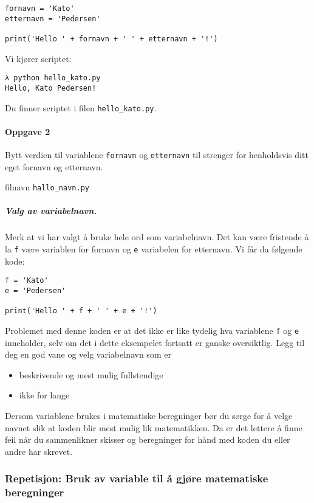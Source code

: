 \documentclass[]{article}
\providecommand{\tightlist}{%
  \setlength{\itemsep}{0pt}\setlength{\parskip}{0pt}}
\let\oldparagraph\paragraph
\renewcommand{\paragraph}[1]{\oldparagraph{#1}\mbox{}}
\let\oldsubparagraph\subparagraph
\renewcommand{\subparagraph}[1]{\oldsubparagraph{#1}\mbox{}}
\begin{document}
\begin{verbatim}
fornavn = 'Kato'
etternavn = 'Pedersen'

print('Hello ' + fornavn + ' ' + etternavn + '!')
\end{verbatim}

Vi kjører scriptet:

\begin{verbatim}
λ python hello_kato.py
Hello, Kato Pedersen!
\end{verbatim}

Du finner scriptet i filen \texttt{hello\_kato.py}.

\paragraph{Oppgave 2}\label{oppgave-2}

Bytt verdien til variablene \texttt{fornavn} og \texttt{etternavn} til
strenger for henholdsvis ditt eget fornavn og etternavn.

filnavn \texttt{hallo\_navn.py}

\subparagraph{Valg av variabelnavn.}\label{valg-av-variabelnavn.}

Merk at vi har valgt å bruke hele ord som variabelnavn. Det kan være
fristende å la \texttt{f} være variablen for fornavn og \texttt{e}
variabelen for etternavn. Vi får da følgende kode:

\begin{verbatim}
f = 'Kato'
e = 'Pedersen'

print('Hello ' + f + ' ' + e + '!')
\end{verbatim}

Problemet med denne koden er at det ikke er like tydelig hva variablene
\texttt{f} og \texttt{e} inneholder, selv om det i dette eksempelet
fortsatt er ganske oversiktlig. Legg til deg en god vane og velg
variabelnavn som er

\begin{itemize}
\tightlist
\item
  beskrivende og mest mulig fullstendige
\item
  ikke for lange
\end{itemize}

Dersom variablene brukes i matematiske beregninger bør du sørge for å
velge navnet slik at koden blir mest mulig lik matematikken. Da er det
lettere å finne feil når du sammenlikner skisser og beregninger for hånd
med koden du eller andre har skrevet.

\subsubsection{Repetisjon: Bruk av variable til å gjøre matematiske
beregninger}\label{repetisjon-bruk-av-variable-til-uxe5-gjuxf8re-matematiske-beregninger}
\end{document}
